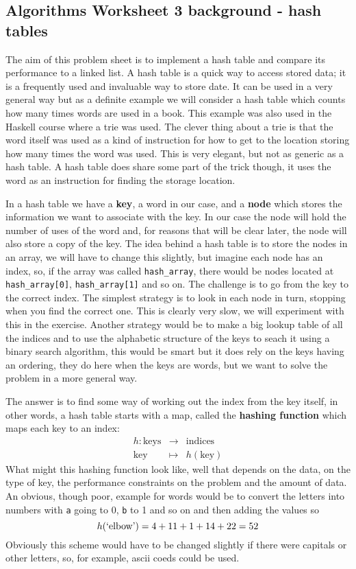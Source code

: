 \documentclass[11pt,a4paper]{scrartcl}
\begin{document}
\subsection*{Algorithms Worksheet 3 background - hash tables}
The aim of this problem sheet is to implement a hash table and compare
its performance to a linked list. A hash table is a quick way to
access stored data; it is a frequently used and invaluable way to
store date. It can be used in a very general way but as a definite
example we will consider a hash table which counts how many times
words are used in a book. This example was also used in the Haskell
course where a trie was used. The clever thing about a trie is that
the word itself was used as a kind of instruction for how to get to
the location storing how many times the word was used. This is very
elegant, but not as generic as a hash table. A hash table does share
some part of the trick though, it uses the word as an instruction for
finding the storage location.

In a hash table we have a \textbf{key}, a word in our case, and a
\textbf{node} which stores the information we want to associate with
the key. In our case the node will hold the number of uses of the word
and, for reasons that will be clear later, the node will also store a
copy of the key. The idea behind a hash table is to store the nodes in
an array, we will have to change this slightly, but imagine each node
has an index, so, if the array was called \texttt{hash\_array}, there
would be nodes located at \texttt{hash\_array[0]},
\texttt{hash\_array[1]} and so on. The challenge is to go from the key
to the correct index. The simplest strategy is to look in each node in
turn, stopping when you find the correct one. This is clearly very
slow, we will experiment with this in the exercise. Another strategy
would be to make a big lookup table of all the indices and to use the
alphabetic structure of the keys to seach it using a binary search
algorithm, this would be smart but it does rely on the keys having an
ordering, they do here when the keys are words, but we want to solve
the problem in a more general way.

The answer is to find some way of working out the index from the key
itself, in other words, a hash table starts with a map, called the
\textbf{hashing function} which maps each key to an index:
\begin{eqnarray}
h:\mbox{keys}&\rightarrow&\mbox{indices}\\
\mbox{key}&\mapsto&h(\mbox{key})
\end{eqnarray}
What might this hashing function look like, well that depends on the
data, on the type of key, the performance constraints on the problem
and the amount of data. An obvious, though poor, example for words
would be to convert the letters into numbers with \texttt{a} going to
0, \texttt{b} to 1 and so on and then adding the values so
\begin{equation}
h(\mbox{\lq{}elbow\rq{}})=4+11+1+14+22=52
\end{equation}
Obviously this scheme would have to be changed slightly if there were
capitals or other letters, so, for example, ascii coeds could be used.
\end{document}
